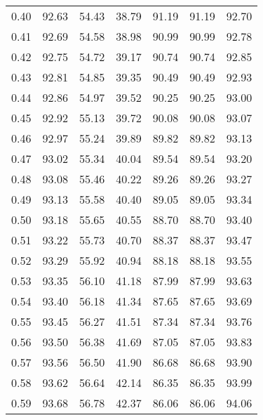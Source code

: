 \begin{tabular}{|c|c|c|c|c|c|c|}
      0.40 &     92.63 &     54.43 &      38.79 &   91.19 &      91.19 &         92.70 \\
      0.41 &     92.69 &     54.58 &      38.98 &   90.99 &      90.99 &         92.78 \\
      0.42 &     92.75 &     54.72 &      39.17 &   90.74 &      90.74 &         92.85 \\
      0.43 &     92.81 &     54.85 &      39.35 &   90.49 &      90.49 &         92.93 \\
      0.44 &     92.86 &     54.97 &      39.52 &   90.25 &      90.25 &         93.00 \\
      0.45 &     92.92 &     55.13 &      39.72 &   90.08 &      90.08 &         93.07 \\
      0.46 &     92.97 &     55.24 &      39.89 &   89.82 &      89.82 &         93.13 \\
      0.47 &     93.02 &     55.34 &      40.04 &   89.54 &      89.54 &         93.20 \\
      0.48 &     93.08 &     55.46 &      40.22 &   89.26 &      89.26 &         93.27 \\
      0.49 &     93.13 &     55.58 &      40.40 &   89.05 &      89.05 &         93.34 \\
      0.50 &     93.18 &     55.65 &      40.55 &   88.70 &      88.70 &         93.40 \\
      0.51 &     93.22 &     55.73 &      40.70 &   88.37 &      88.37 &         93.47 \\
      0.52 &     93.29 &     55.92 &      40.94 &   88.18 &      88.18 &         93.55 \\
      0.53 &     93.35 &     56.10 &      41.18 &   87.99 &      87.99 &         93.63 \\
      0.54 &     93.40 &     56.18 &      41.34 &   87.65 &      87.65 &         93.69 \\
      0.55 &     93.45 &     56.27 &      41.51 &   87.34 &      87.34 &         93.76 \\
      0.56 &     93.50 &     56.38 &      41.69 &   87.05 &      87.05 &         93.83 \\
      0.57 &     93.56 &     56.50 &      41.90 &   86.68 &      86.68 &         93.90 \\
      0.58 &     93.62 &     56.64 &      42.14 &   86.35 &      86.35 &         93.99 \\
      0.59 &     93.68 &     56.78 &      42.37 &   86.06 &      86.06 &         94.06 \\

\end{tabular}
